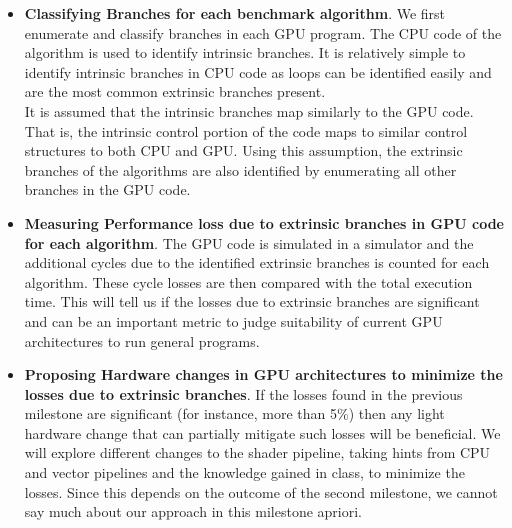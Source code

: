 \begin{itemize}

\item \textbf{Classifying Branches for each benchmark algorithm}. We first enumerate and classify branches in each GPU program. The CPU code of the algorithm is used to identify intrinsic branches. It is relatively simple to identify intrinsic branches in CPU code as loops can be identified easily and are the most common extrinsic branches present.
\\
It is assumed that the intrinsic branches map similarly to the GPU code. That is, the intrinsic control portion of the code maps to similar control structures to both CPU and GPU. Using this assumption, the extrinsic branches of the algorithms are also identified by enumerating all other branches in the GPU code.

\item \textbf{Measuring Performance loss due to extrinsic branches in GPU code for each algorithm}. The GPU code is simulated in a simulator and the additional cycles due to the identified extrinsic branches is counted for each algorithm. These cycle losses are then compared with the total execution time. This will tell us if the losses due to extrinsic branches are significant and can be an important metric to judge suitability of current GPU architectures to run general programs.

\item \textbf{Proposing Hardware changes in GPU architectures to minimize the losses due to extrinsic branches}. If the losses found in the previous milestone are significant (for instance, more than 5\%) then any light hardware change that can partially mitigate such losses will be beneficial. We will explore different changes to the shader pipeline, taking hints from CPU and vector pipelines and the knowledge gained in class, to minimize the losses. Since this depends on the outcome of the second milestone, we cannot say much about our approach in this milestone apriori. 

\end{itemize}
